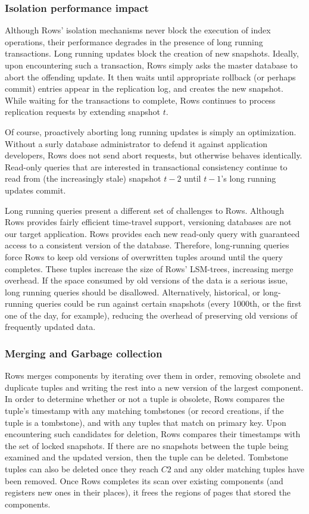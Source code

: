 \documentclass{sig-alternate-sigmod08}
\newcommand{\rows}{Rows\xspace}
\newcommand{\rowss}{Rows'\xspace}
\begin{document}
\subsubsection{Isolation performance impact}

Although \rowss isolation mechanisms never block the execution of
index operations, their performance degrades in the presence of long
running transactions. Long running updates block the creation of new
snapshots.  Ideally, upon encountering such a transaction, \rows
simply asks the master database to abort the offending update.  It
then waits until appropriate rollback (or perhaps commit) entries
appear in the replication log, and creates the new snapshot.  While
waiting for the transactions to complete, \rows continues to process
replication requests by extending snapshot $t$.

Of course, proactively aborting long running updates is simply an
optimization.  Without a surly database administrator to defend it
against application developers, \rows does not send abort requests,
but otherwise behaves identically.  Read-only queries that are
interested in transactional consistency continue to read from (the
increasingly stale) snapshot $t-2$ until $t-1$'s long running
updates commit.

Long running queries present a different set of challenges to \rows.
Although \rows provides fairly efficient time-travel support,
versioning databases are not our target application.  \rows
provides each new read-only query with guaranteed access to a
consistent version of the database.  Therefore, long-running queries
force \rows to keep old versions of overwritten tuples around until
the query completes.  These tuples increase the size of \rowss
LSM-trees, increasing merge overhead.  If the space consumed by old
versions of the data is a serious issue, long running queries should
be disallowed.  Alternatively, historical, or long-running queries
could be run against certain snapshots (every 1000th, or the first
one of the day, for example), reducing the overhead of preserving
old versions of frequently updated data.

\subsubsection{Merging and Garbage collection}

\rows merges components by iterating over them in order, removing
obsolete and duplicate tuples and writing the rest into a new version
of the largest component.  In order to determine whether or not a
tuple is obsolete, \rows compares the tuple's timestamp with any
matching tombstones (or record creations, if the tuple is a
tombstone), and with any tuples that match on primary key.  Upon
encountering such candidates for deletion, \rows compares their
timestamps with the set of locked snapshots.  If there are no
snapshots between the tuple being examined and the updated version,
then the tuple can be deleted.  Tombstone tuples can also be deleted once
they reach $C2$ and any older matching tuples have been removed.
Once \rows completes its scan over existing components (and registers
new ones in their places), it frees the regions of pages that stored
the components.
\end{document}
